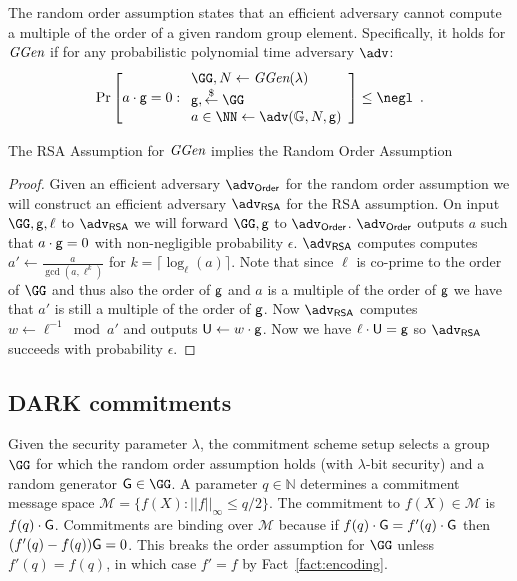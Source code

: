 \begin{assumption}
\label{assum:randomorder}
	The random order assumption states that an efficient adversary cannot compute a multiple of the order of a given random group element. Specifically, it holds for $\textit{GGen}$ if for any probabilistic polynomial time adversary $\adv$:
	\[
    \Pr\left[a\cdot \Generator =0:
    \begin{array}{l}
         \GG, N \leftarrow \ggen(\lambda)  \\
         \Generator, \sample \GG\\
         a \in \NN \leftarrow \adv(\mathbb{G},N, \Generator) \\
    \end{array}\right] \leq \negl \enspace .
    \]
\end{assumption}
\begin{lemma}
\label{lem:roa-to-rsa}
	The RSA Assumption for $\textit{GGen}$ implies the Random Order Assumption
	\end{lemma}
\begin{proof}
	Given an efficient adversary $\adv_{\textsf{Order}}$ for the random order assumption we will construct an efficient adversary $\adv_{\textsf{RSA}}$ for the RSA assumption. On input $\GG,\Generator,\ell$ to $\adv_{\textsf{RSA}}$ we will forward $\GG,\Generator$ to $\adv_{\textsf{Order}}$. $\adv_{\textsf{Order}}$ outputs $a$ such that $a\cdot \mathsf{g}=0$ with non-negligible probability $\epsilon$. 
	$\adv_{\textsf{RSA}}$ computes computes $a'\gets \frac{a}{\gcd(a,\ell^k)}$ for $k=\lceil\log_\ell(a)\rceil$. Note that since $\ell$ is co-prime to the order of $\GG$ and thus also the order of $\mathsf{g}$ and $a$ is a multiple of the order of $\mathsf{g}$ we have that $a'$ is still a multiple of the order of $\mathsf{g}$. Now $\adv_{\textsf{RSA}}$ computes $w\gets \ell^{-1} \bmod a'$ and outputs $\mathsf{U} \gets w\cdot \mathsf{g}$. Now we have $\ell \cdot \mathsf{U}=\mathsf{g}$ so $\adv_{\textsf{RSA}}$ succeeds with probability $\epsilon$.
\end{proof}
\subsection{DARK commitments} 
Given the security parameter $\lambda$, the commitment scheme setup selects a group $\GG$ for which the random order assumption holds (with  $\lambda$-bit security) and a random generator $\gr{G} \in \GG$. A parameter $q \in \mathbb{N}$ determines a commitment message space $\mathcal{M} = \{f(X): ||f||_\infty \leq q/2\}$. The commitment to $f(X) \in \mathcal{M}$ is $f(q) \cdot  \mathsf{G}$. Commitments are binding over $\mathcal{M}$ because if $f(q) \cdot \mathsf{G} = f'(q) \cdot \mathsf{G}$ then $(f'(q) - f(q)) \mathsf{G} = 0$. This breaks the order assumption for $\GG$ unless $ f'(q) =  f(q)$, in which case $f' = f$ by Fact~\ref{fact:encoding}. 

